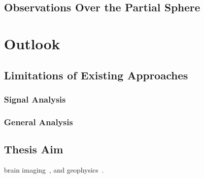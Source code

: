 \subsection{Observations Over the Partial Sphere}

\section{Outlook}\label{sec:chapter2_outlook}

\subsection{Limitations of Existing Approaches}

\subsubsection{Signal Analysis}

\subsubsection{General Analysis}

\subsection{Thesis Aim}

\eg{} brain imaging~\cite{Hammond2011}, and geophysics~\cite{Pavlis2013}.
